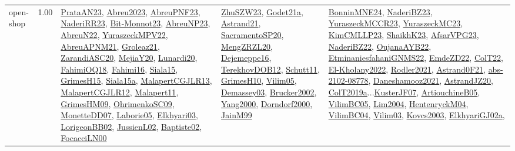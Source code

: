 {\begin{longtable}{p{3cm}r>{\raggedright\arraybackslash}p{6cm}>{\raggedright\arraybackslash}p{6cm}>{\raggedright\arraybackslash}p{8cm}}
\index{open-shop}\index{Concepts!open-shop}open-shop &  1.00 & \hyperref[detail:PrataAN23]{PrataAN23}, \hyperref[detail:Abreu2023]{Abreu2023}, \hyperref[detail:AbreuPNF23]{AbreuPNF23}, \hyperref[detail:NaderiRR23]{NaderiRR23}, \hyperref[detail:Bit-Monnot23]{Bit-Monnot23}, \hyperref[detail:AbreuNP23]{AbreuNP23}, \hyperref[detail:AbreuN22]{AbreuN22}, \hyperref[detail:YuraszeckMPV22]{YuraszeckMPV22}, \hyperref[detail:AbreuAPNM21]{AbreuAPNM21}, \hyperref[detail:Groleaz21]{Groleaz21}, \hyperref[detail:ZarandiASC20]{ZarandiASC20}, \hyperref[detail:MejiaY20]{MejiaY20}, \hyperref[detail:Lunardi20]{Lunardi20}, \hyperref[detail:FahimiOQ18]{FahimiOQ18}, \hyperref[detail:Fahimi16]{Fahimi16}, \hyperref[detail:Siala15]{Siala15}, \hyperref[detail:GrimesH15]{GrimesH15}, \hyperref[detail:Siala15a]{Siala15a}, \hyperref[detail:MalapertCGJLR13]{MalapertCGJLR13}, \hyperref[detail:MalapertCGJLR12]{MalapertCGJLR12}, \hyperref[detail:Malapert11]{Malapert11}, \hyperref[detail:GrimesHM09]{GrimesHM09}, \hyperref[detail:OhrimenkoSC09]{OhrimenkoSC09}, \hyperref[detail:MonetteDD07]{MonetteDD07}, \hyperref[detail:Laborie05]{Laborie05}, \hyperref[detail:Elkhyari03]{Elkhyari03}, \hyperref[detail:LorigeonBB02]{LorigeonBB02}, \hyperref[detail:JussienL02]{JussienL02}, \hyperref[detail:Baptiste02]{Baptiste02}, \hyperref[detail:FocacciLN00]{FocacciLN00} & \hyperref[detail:ZhuSZW23]{ZhuSZW23}, \hyperref[detail:Godet21a]{Godet21a}, \hyperref[detail:Astrand21]{Astrand21}, \hyperref[detail:SacramentoSP20]{SacramentoSP20}, \hyperref[detail:MengZRZL20]{MengZRZL20}, \hyperref[detail:Dejemeppe16]{Dejemeppe16}, \hyperref[detail:TerekhovDOB12]{TerekhovDOB12}, \hyperref[detail:Schutt11]{Schutt11}, \hyperref[detail:GrimesH10]{GrimesH10}, \hyperref[detail:Vilim05]{Vilim05}, \hyperref[detail:Demassey03]{Demassey03}, \hyperref[detail:Brucker2002]{Brucker2002}, \hyperref[detail:Yang2000]{Yang2000}, \hyperref[detail:Dorndorf2000]{Dorndorf2000}, \hyperref[detail:JainM99]{JainM99} & \hyperref[detail:BonninMNE24]{BonninMNE24}, \hyperref[detail:NaderiBZ23]{NaderiBZ23}, \hyperref[detail:YuraszeckMCCR23]{YuraszeckMCCR23}, \hyperref[detail:YuraszeckMC23]{YuraszeckMC23}, \hyperref[detail:KimCMLLP23]{KimCMLLP23}, \hyperref[detail:ShaikhK23]{ShaikhK23}, \hyperref[detail:AfsarVPG23]{AfsarVPG23}, \hyperref[detail:NaderiBZ22]{NaderiBZ22}, \hyperref[detail:OujanaAYB22]{OujanaAYB22}, \hyperref[detail:EtminaniesfahaniGNMS22]{EtminaniesfahaniGNMS22}, \hyperref[detail:EmdeZD22]{EmdeZD22}, \hyperref[detail:ColT22]{ColT22}, \hyperref[detail:El-Kholany2022]{El-Kholany2022}, \hyperref[detail:Rodler2021]{Rodler2021}, \hyperref[detail:Astrand0F21]{Astrand0F21}, \hyperref[detail:abs-2102-08778]{abs-2102-08778}, \hyperref[detail:Daneshamooz2021]{Daneshamooz2021}, \hyperref[detail:AstrandJZ20]{AstrandJZ20}, \hyperref[detail:ColT2019a]{ColT2019a}...\hyperref[detail:KusterJF07]{KusterJF07}, \hyperref[detail:ArtiouchineB05]{ArtiouchineB05}, \hyperref[detail:VilimBC05]{VilimBC05}, \hyperref[detail:Lim2004]{Lim2004}, \hyperref[detail:HentenryckM04]{HentenryckM04}, \hyperref[detail:VilimBC04]{VilimBC04}, \hyperref[detail:Vilim03]{Vilim03}, \hyperref[detail:Kovcs2003]{Kovcs2003}, \hyperref[detail:ElkhyariGJ02a]{ElkhyariGJ02a}, 
\end{longtable}}
